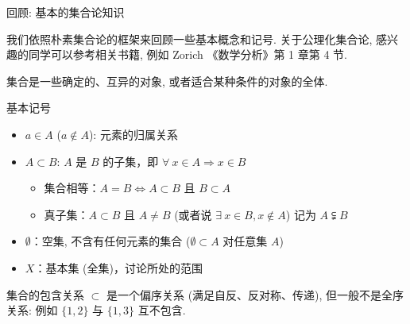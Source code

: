 \begin{frame}{回顾: 基本的集合论知识}

我们依照朴素集合论的框架来回顾一些基本概念和记号. 关于公理化集合论, 感兴趣的同学可以参考相关书籍, 例如 Zorich 《数学分析》第 1 章第 4 节.

\vspace{0.5em}

\begin{Def}[集合]
集合是一些\alert{确定的}、\alert{互异的}对象, 或者适合\alert{某种条件}的对象的\alert{全体}.
\end{Def}

\pause

\begin{block}{基本记号}
\begin{itemize}
\item $a \in A$ ($a \notin A$): 元素的归属关系
\item $A \subset B$: $A$ 是 $B$ 的\alert{子集}，即 $\forall ~ x \in A \Rightarrow x \in B$
\begin{itemize}
\item 集合相等：$A = B \iff A \subset B$ 且 $B \subset A$
\item 真子集：$A \subset B$ 且 $A \neq B$ (或者说 $\exists ~ x \in B, x \notin A$) 记为 $A \subsetneqq B$
\end{itemize}
\item $\emptyset$：空集, 不含有任何元素的集合 ($\emptyset \subset A$ 对任意集 $A$)
\item $X$：基本集 (全集)，讨论所处的范围
\end{itemize}
\end{block}

\begin{remark}
集合的包含关系 $\subset$ 是一个\alert{偏序关系} (满足自反、反对称、传递), 但一般不是全序关系: 例如 $\{1, 2\}$ 与 $\{1, 3\}$ 互不包含.
\end{remark}

\end{frame}



